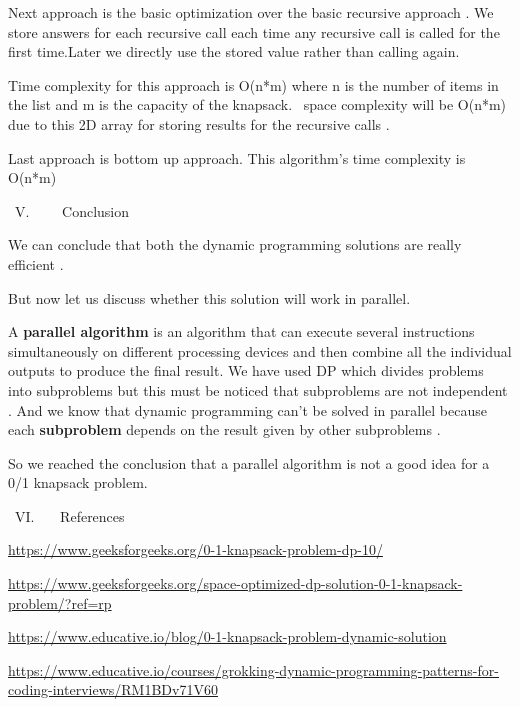 \documentclass[letterpaper]{article}
\begin{document}
\begin{multicols}{2}
\begin{itemize}
\bigskip

Next approach is the basic optimization over the basic recursive approach . We store answers for each recursive call
each time any recursive call is called for the first time.Later we directly use the stored value rather than calling
again. 

Time complexity for this approach is O(n*m) where n is the number of items in the list and m is the capacity of the
knapsack. \ space complexity will be O(n*m) due to this 2D array for storing results for the recursive calls .


\bigskip

Last approach is bottom up approach. This algorithm's time complexity is O(n*m)

{\mdseries
\ V. \ \ \ \ Conclusion }

We can conclude that both the dynamic programming solutions are really efficient .

But now let us discuss whether this solution will work in parallel. 


\bigskip

A \textbf{parallel algorithm} is an algorithm that can execute several instructions simultaneously on different
processing devices and then combine all the individual outputs to produce the final result. We have used DP which
divides problems into subproblems but this must be noticed that subproblems are not independent . And we know that
dynamic programming can't be solved in parallel because each \textbf{subproblem} depends on the result given by other
subproblems .


\bigskip

So we reached the conclusion that a parallel algorithm is not a good idea for a 0/1 knapsack problem.


\bigskip
{\mdseries
\ VI. \ \ \ References}

\url{https://www.geeksforgeeks.org/0-1-knapsack-problem-dp-10/}

\url{https://www.geeksforgeeks.org/space-optimized-dp-solution-0-1-knapsack-problem/?ref=rp}

\url{https://www.educative.io/blog/0-1-knapsack-problem-dynamic-solution}

\url{https://www.educative.io/courses/grokking-dynamic-programming-patterns-for-coding-interviews/RM1BDv71V60}
\end{itemize}
\end{multicols}
\end{document}
